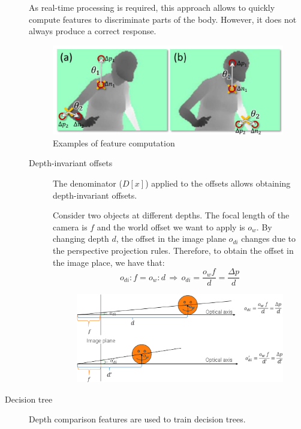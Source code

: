 \begin{description}
        \begin{remark}
            As real-time processing is required, this approach allows to quickly compute features to discriminate parts of the body. However, it does not always produce a correct response.
        \end{remark}

        \begin{figure}[H]
            \centering
            \includegraphics[width=0.6\linewidth]{./img/_depth_comparison_features.pdf}
            \caption{Examples of feature computation}
        \end{figure}

        \begin{description}
            \item[Depth-invariant offsets]
                The denominator ($D[x]$) applied to the offsets allows obtaining depth-invariant offsets.

                Consider two objects at different depths. The focal length of the camera is $f$ and the world offset we want to apply is $o_w$. By changing depth $d$, the offset in the image plane $o_{di}$ changes due to the perspective projection rules. Therefore, to obtain the offset in the image place, we have that:
                \[ o_{di} : f = o_w : d \,\Rightarrow\, o_{di} = \frac{o_w f}{d} = \frac{\Delta p}{d} \]

                \begin{figure}[H]
                    \centering
                    \includegraphics[width=0.6\linewidth]{./img/_depth_invariant_offset.pdf}
                \end{figure}
        \end{description}

    \item[Decision tree] 
        Depth comparison features are used to train decision trees.


\end{description}
